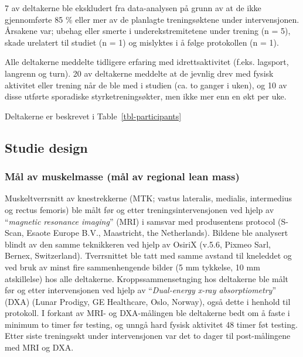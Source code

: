\documentclass[
  letterpaper,
  DIV=11,
  numbers=noendperiod]{scrreprt}
\begin{document}
7 av deltakerne ble ekskludert fra data-analysen på grunn av at de ikke
gjennomførte 85 \% eller mer av de planlagte treningsøktene under
intervensjonen. Årsakene var; ubehag eller smerte i underekstremitetene
under trening (n = 5), skade urelatert til studiet (n = 1) og mislyktes
i å følge protokollen (n = 1).

Alle deltakerne meddelte tidligere erfaring med idrettsaktivitet (f.eks.
lagsport, langrenn og turn). 20 av deltakerne meddelte at de jevnlig
drev med fysisk aktivitet eller trening når de ble med i studien (ca. to
ganger i uken), og 10 av disse utførte sporadiske styrketreningsøkter,
men ikke mer enn en økt per uke.

Deltakerne er beskrevet i Table~\ref{tbl-participants}

\begin{table}

\caption{\label{tbl-participants}Deltakeroversikt}


\end{table}%

\subsection{Studie design}\label{studie-design}

\subsubsection{Mål av muskelmasse (mål av regional lean
mass)}\label{muxe5l-av-muskelmasse-muxe5l-av-regional-lean-mass}

Muskeltverrsnitt av knestrekkerne (MTK; vastus lateralis, medialis,
intermedius og rectus femoris) ble målt før og etter
treningsintervensjonen ved hjelp av ``\emph{magnetic resonance
imaging}'' (MRI) i samsvar med produsentens protocol (S-Scan, Esaote
Europe B.V., Maastricht, the Netherlands). Bildene ble analysert blindt
av den samme teknikkeren ved hjelp av OsiriX (v.5.6, Pixmeo Sarl,
Bernex, Switzerland). Tverrsnittet ble tatt med samme avstand til
kneleddet og ved bruk av minst fire sammenhengende bilder (5 mm
tykkelse, 10 mm atskillelse) hos alle deltakerne. Kroppssammensetnging
hos deltakerne ble målt før og etter intervensjonen ved hjelp av
``\emph{Dual-energy x-ray absorptiometry}'' (DXA) (Lunar Prodigy, GE
Healthcare, Oslo, Norway), også dette i henhold til protokoll. I forkant
av MRI- og DXA-målingen ble deltakerne bedt om å faste i minimum to
timer før testing, og unngå hard fysisk aktivitet 48 timer føt testing.
Etter siste treningsøkt under intervensjonen var det to dager til
post-målingene med MRI og DXA.
\end{document}
